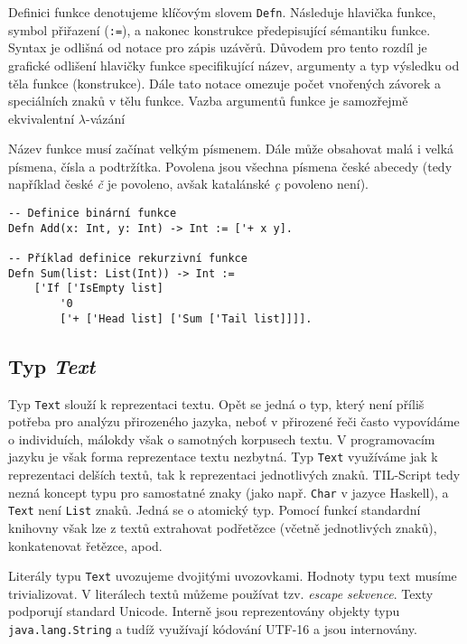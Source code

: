 Definici funkce denotujeme klíčovým slovem \lstinline{Defn}. Následuje hlavička funkce, symbol
přiřazení (\lstinline{:=}), a nakonec konstrukce předepisující sémantiku funkce. Syntax je odlišná
od notace pro zápis uzávěrů. Důvodem pro tento rozdíl je grafické odlišení hlavičky funkce
specifikující název, argumenty a typ výsledku od těla funkce (konstrukce). Dále tato notace
omezuje počet vnořených závorek a speciálních znaků v tělu funkce. Vazba argumentů funkce je
samozřejmě ekvivalentní $\lambda$-vázání

Název funkce musí začínat velkým písmenem. Dále může obsahovat malá i velká písmena, čísla
a podtržítka. Povolena jsou všechna písmena české abecedy (tedy například české \textit{č} je
povoleno, avšak katalánské \textit{\c{c}} povoleno není).

\begin{lstlisting}[caption={Příklad definice funkcí}]
-- Definice binární funkce
Defn Add(x: Int, y: Int) -> Int := ['+ x y].

-- Příklad definice rekurzivní funkce
Defn Sum(list: List(Int)) -> Int :=
    ['If ['IsEmpty list]
        '0
        ['+ ['Head list] ['Sum ['Tail list]]]].
\end{lstlisting}

\subsection{Typ \textit{Text}}\label{text-type}

Typ \lstinline{Text} slouží k reprezentaci textu. Opět se jedná o typ, který není příliš potřeba
pro analýzu přirozeného jazyka, neboť v přirozené řeči často vypovídáme o individuích, málokdy však
o samotných korpusech textu. V programovacím jazyku je však forma reprezentace textu nezbytná.
Typ \lstinline{Text} využíváme jak k reprezentaci delších textů, tak k reprezentaci jednotlivých
znaků. TIL-Script tedy nezná koncept typu pro samostatné znaky (jako např. \lstinline{Char}
v jazyce Haskell), a \lstinline{Text} není \lstinline{List} znaků. Jedná se o atomický typ. Pomocí
funkcí standardní knihovny však lze z textů extrahovat podřetězce (včetně jednotlivých znaků),
konkatenovat řetězce, apod.

Literály typu \lstinline{Text} uvozujeme dvojitými uvozovkami. Hodnoty typu text musíme
trivializovat. V literálech textů můžeme používat tzv. \textit{escape sekvence}. Texty podporují
standard Unicode. Interně jsou reprezentovány objekty typu \lstinline{java.lang.String} a tudíž
využívají kódování UTF-16 a jsou internovány.

